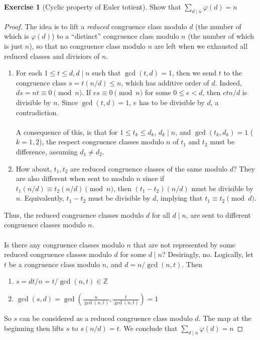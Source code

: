 \documentclass{article}
\theoremstyle{definition}
\newtheorem{exercise}[theorem]{Exercise}
\begin{document}
\begin{exercise}[Cyclic property of Euler totient]
Show that $\sum_{d \mid n} \varphi(d) = n$
\end{exercise}
\begin{proof}
The idea is to lift a \textit{reduced} congruence class modulo $d$ (the number of which is $\varphi(d)$) to a ``distinct'' congruence class modulo $n$ (the number of which is just $n$), so that no congruence class modulo $n$ are left when we exhausted all reduced classes and divisiors of $n$.
\begin{enumerate}
	\item For each $1 \leq t \leq d, d \mid n$ such that $\gcd(t, d) = 1$, then we send $t$ to the congruence class $s = t(n/d) \leq n$, which has additive order of $d$. Indeed, $ds = nt \equiv 0 \pmod{n}$. If $es \equiv 0 \pmod{n}$ for some $0 \leq e < d$, then $etn/d$ is divisible by $n$. Since $\gcd(t, d) = 1$, $e$ has to be divisible by $d$, a contradiction.
	\\
	\\
	A consequence of this, is that for $1 \leq t_k \leq d_k$, $d_k \mid n$, and $\gcd(t_k, d_k) = 1$ ($k = 1, 2$), the respect congruence classes modulo $n$ of $t_1$ and $t_2$ must be difference, assuming $d_1 \neq d_2$.
	\item How about, $t_1, t_2$ are reduced congruence classes of the same modulo $d$? They are also different when sent to modulo $n$ since if $t_1 (n/d) \equiv t_2 (n/d) \pmod{n}$, then $(t_1 - t_2) (n/d)$ must be divisible by $n$. Equivalently, $t_1 - t_2$ must be divisible by $d$, implying that $t_1 \equiv t_2 \pmod{d}$.
\end{enumerate}
Thus, the reduced congruence classes modulo $d$ for all $d \mid n$, are sent to different congruence classes modulo $n$.
\\
\\
Is there any congruence classes modulo $n$ that are not represented by some reduced congruence classes modulo $d$ for some $d \mid n$? Desiringly, no. Logically, let $t$ be a congruence class modulo $n$, and $d = n/\gcd(n, t)$. Then
\begin{enumerate}
	\item $s = dt/n = t/\gcd(n, t) \in \mathbb{Z}$
	\item $\gcd(s, d) = \gcd \left( \frac{n}{\gcd(n, t)}, \frac{t}{\gcd(n,t)} \right) = 1$
\end{enumerate}
So $s$ can be considered as a reduced congruence class modulo $d$. The map at the beginning then lifts $s$ to $s (n/d) = t$. We conclude that $\sum_{d \mid n} \varphi(d) = n$
\end{proof}
\end{document}
